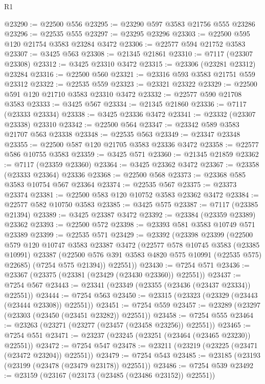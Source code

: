 \begin{lexlean}{R1}
\begin{coremodule}
@23290 := @22500 @556
@23295 := @23290 @597 @3583 @21756 @555 @23286
@23296 := @22535 @555
@23297 := @23295 @23296
@23303 := @22500 @595 @120 @21754 @3583 @23284 @3472
@23306 := @22577 @594 @21752 @3583
@23307 := @3425 @563
@23308 := @21345 @21861
@23310 := @7117 (@23307 @23308)
@23312 := @3425 @23310 @3472
@23315 := @23306 (@23281 @23312) @23284
@23316 := @22500 @560
@23321 := @23316 @593 @3583 @21751 @559 @23312
@23322 := @22535 @559
@23323 := @23321 @23322
@23329 := @22500 @591 @120 @21710 @3583 @23310 @3472
@23332 := @22577 @590 @21708 @3583
@23333 := @3425 @567
@23334 := @21345 @21860
@23336 := @7117 (@23333 @23334)
@23338 := @3425 @23336 @3472
@23341 := @23332 (@23307 @23338) @23310
@23342 := @22500 @564
@23347 := @23342 @589 @3583 @21707 @563 @23338
@23348 := @22535 @563
@23349 := @23347 @23348
@23355 := @22500 @587 @120 @21705 @3583 @23336 @3472
@23358 := @22577 @586 @10755 @3583
@23359 := @3425 @571
@23360 := @21345 @21859
@23362 := @7117 (@23359 @23360)
@23364 := @3425 @23362 @3472
@23367 := @23358 (@23333 @23364) @23336
@23368 := @22500 @568
@23373 := @23368 @585 @3583 @10754 @567 @23364
@23374 := @22535 @567
@23375 := @23373 @23374
@23381 := @22500 @583 @120 @10752 @3583 @23362 @3472
@23384 := @22577 @582 @10750 @3583
@23385 := @3425 @575
@23387 := @7117 (@23385 @21394)
@23389 := @3425 @23387 @3472
@23392 := @23384 (@23359 @23389) @23362
@23393 := @22500 @572
@23398 := @23393 @581 @3583 @10749 @571 @23389
@23399 := @22535 @571
@23429 := @23392
    (@23398
      @23399
      (@22500
        @579
        @120
        @10747
        @3583
        @23387
        @3472
        (@22577
          @578
          @10745
          @3583
          (@23385 @10991)
          @23387
          (@22500 @576 @391 @3583 @4820 @575 @10991 (@22535 @575) @22685)
          (@7254 @575 @21394))
        @22551))
@23430 := @7254 @571
@23436 := @23367 (@23375 (@23381 (@23429 (@23430 @23360)) @22551))
@23437 := @7254 @567
@23443 := @23341 (@23349 (@23355 (@23436 (@23437 @23334)) @22551))
@23444 := @7254 @563
@23450 := @23315 (@23323 (@23329 (@23443 (@23444 @23308)) @22551))
@23451 := @7254 @559
@23457 := @23289 (@23297 (@23303 (@23450 (@23451 @23282)) @22551))
@23458 := @7254 @555
@23464 := @23263 (@23271 (@23277 (@23457 (@23458 @23256)) @22551))
@23465 := @7254 @551
@23471 := @23237 (@23245 (@23251 (@23464 (@23465 @23230)) @22551))
@23472 := @7254 @547
@23478 := @23211 (@23219 (@23225 (@23471 (@23472 @23204)) @22551))
@23479 := @7254 @543
@23485 := @23185 (@23193 (@23199 (@23478 (@23479 @23178)) @22551))
@23486 := @7254 @539
@23492 := @23159 (@23167 (@23173 (@23485 (@23486 @23152)) @22551))

\end{coremodule}
\end{lexlean}
